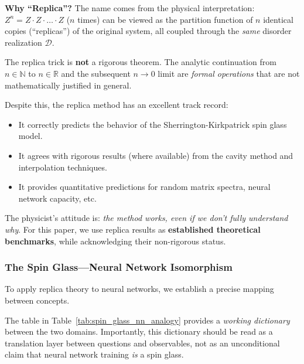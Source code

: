 \documentclass[
  journal=largetwo,
  year=2025,
  volume=37,
]{cup-journal}
\begin{document}
\textbf{Why ``Replica''?} The name comes from the physical interpretation: $Z^n = Z \cdot Z \cdot \ldots \cdot Z$ ($n$ times) can be viewed as the partition function of $n$ identical copies (``replicas'') of the original system, all coupled through the \textit{same} disorder realization $\mathcal{D}$.

\begin{remark}
The replica trick is \textbf{not} a rigorous theorem. The analytic continuation from $n \in \mathbb{N}$ to $n \in \mathbb{R}$ and the subsequent $n \to 0$ limit are \textit{formal operations} that are not mathematically justified in general.

Despite this, the replica method has an excellent track record:
\begin{itemize}
    \item It correctly predicts the behavior of the Sherrington-Kirkpatrick spin glass model.
    \item It agrees with rigorous results (where available) from the cavity method and interpolation techniques.
    \item It provides quantitative predictions for random matrix spectra, neural network capacity, etc.
\end{itemize}

The physicist's attitude is: \textit{the method works, even if we don't fully understand why}. For this paper, we use replica results as \textbf{established theoretical benchmarks}, while acknowledging their non-rigorous status.
\end{remark}

\subsubsection{The Spin Glass---Neural Network Isomorphism}

To apply replica theory to neural networks, we establish a precise mapping between concepts.

\begin{definition}\label{def:spin_glass_dictionary}
The table in Table~\ref{tab:spin_glass_nn_analogy} provides a \emph{working dictionary} between the two domains. Importantly, this dictionary should be read as a translation layer between questions and observables, not as an unconditional claim that neural network training \emph{is} a spin glass.
\end{definition}
\end{document}
